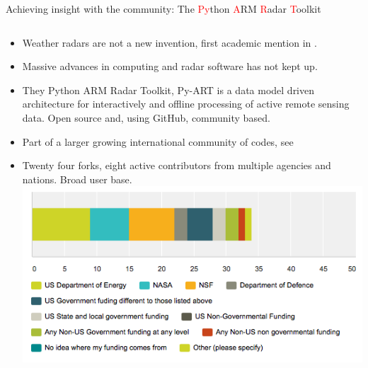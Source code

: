 \documentclass[final]{beamer}
\begin{document}
\begin{frame}{}
\begin{columns}[t]
\begin{column}{.3\linewidth}
         
        \begin{block}{Achieving insight with the community: The \textcolor{red}{Py}thon \textcolor{red}{A}RM \textcolor{red}{R}adar \textcolor{red}{T}oolkit}
                \begin{columns}[t]
                    \begin{column}{.6\linewidth}
                        \begin{itemize}
                            \item Weather radars are not a new invention, first academic mention in \citet{bent_radar_1943}.
                            \item Massive advances in computing and radar software has not kept up.
                            \item They Python ARM Radar Toolkit, Py-ART  is a data model driven architecture for interactively and 
                            offline processing of active remote sensing data. Open source and, using GitHub, community based.
                            \item Part of a larger growing international community of codes, see \citet{heistermann_emergence_2014}
                            \item Twenty four forks, eight active contributors from multiple agencies and nations. Broad user base. 
                             \includegraphics[width=0.8\linewidth]{figures/survey}\\[1ex]                        
                       \end{itemize}
                   \end{column}
\end{columns}
\end{block}
\end{column}
\end{columns}
\end{frame}
\end{document}
